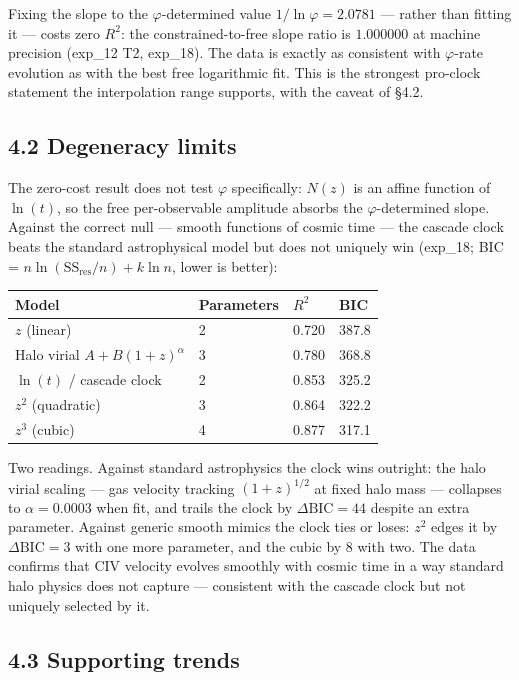 \documentclass[11pt,a4paper]{article}
\begin{document}
Fixing the slope to the $\varphi$-determined value $1/\ln\varphi = 2.0781$ — rather than fitting it — costs zero $R^2$: the constrained-to-free slope ratio is $1.000000$ at machine precision (exp\_12 T2, exp\_18). The data is exactly as consistent with $\varphi$-rate evolution as with the best free logarithmic fit. This is the strongest pro-clock statement the interpolation range supports, with the caveat of §4.2.

\subsection*{4.2 Degeneracy limits}

The zero-cost result does not test $\varphi$ specifically: $N(z)$ is an affine function of $\ln(t)$, so the free per-observable amplitude absorbs the $\varphi$-determined slope. Against the correct null — smooth functions of cosmic time — the cascade clock beats the standard astrophysical model but does not uniquely win (exp\_18; BIC = $n\ln(\text{SS}_{\text{res}}/n) + k\ln n$, lower is better):

\begin{longtable}[]{@{}llll@{}}
\toprule
Model & Parameters & $R^2$ & BIC \\
\midrule\endhead
$z$ (linear) & 2 & 0.720 & 387.8 \\
Halo virial $A + B(1+z)^{\alpha}$ & 3 & 0.780 & 368.8 \\
$\ln(t)$ / cascade clock & 2 & 0.853 & 325.2 \\
$z^2$ (quadratic) & 3 & 0.864 & 322.2 \\
$z^3$ (cubic) & 4 & 0.877 & 317.1 \\
\bottomrule
\end{longtable}

Two readings. Against standard astrophysics the clock wins outright: the halo virial scaling — gas velocity tracking $(1+z)^{1/2}$ at fixed halo mass — collapses to $\alpha = 0.0003$ when fit, and trails the clock by $\Delta\text{BIC} = 44$ despite an extra parameter. Against generic smooth mimics the clock ties or loses: $z^2$ edges it by $\Delta\text{BIC} = 3$ with one more parameter, and the cubic by $8$ with two. The data confirms that CIV velocity evolves smoothly with cosmic time in a way standard halo physics does not capture — consistent with the cascade clock but not uniquely selected by it.

\subsection*{4.3 Supporting trends}
\end{document}
